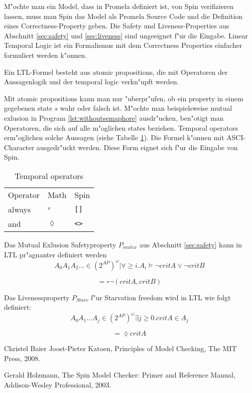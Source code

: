 \documentclass[a4paper, twoside]{article}
\begin{document}
M"ochte man ein Model, dass in Promela definiert ist, von Spin verifizieren lassen, muss man Spin das Model als Promela Source Code und die Definition eines Correctness-Property geben. Die Safety und Liveness-Properties aus Abschnitt \ref{sec:safety} und \ref{sec:liveness} sind ungeeignet f"ur die Eingabe. Linear Temporal Logic ist ein Formalismus mit dem Correctness Properties einfacher formuliert werden k"onnen.

Ein LTL-Formel besteht aus atomic propositions, die mit Operatoren der Aussagenlogik  und der temporal logic verkn"upft werden.

Mit atomic propositions kann man nur "uberpr"ufen, ob ein property in einem gegebenen state $s$ wahr oder falsch ist. M"ochte man beispielsweise mutual exlusion in Program \ref{lst:withoutsemaphore} ausdr"ucken, ben"otigt man Operatoren, die sich auf alle m"oglichen states beziehen. Temporal operators erm"oglichen solche Aussagen (siehe Tabelle \ref{tab:temporal_operators}). Die Formel k"onnen mit ASCI-Character ausgedr"uckt werden. Diese Form eignet sich f"ur die Eingabe von Spin.

\begin{table}
  \centering
  \begin{tabular}{l l l}
    Operator & Math & Spin \\
    always & $\square$ & \verb|[]| \\
    and & $\lozenge$ & \verb|<>| \\
  \end{tabular}
  \caption{Temporal operators }
  \label{tab:temporal_operators}
\end{table}

Das Mutual Exlusion Safetyproperty $P_{mutex}$ aus Abschnitt \ref{sec:safety} kann in LTL pr"agnanter definiert werden
\[
  {A_0 A_1 A_2 \dots \in (2^{AP})^{\omega} | \forall \geq i.   A_i \models \neg critA \lor \neg critB}
\]

\[
= \square \neg (critA,critB)
\]

Das Livenessproperty $P_{Starv}$ f"ur Starvation freedom wird in LTL wie folgt definiert:
\[
 { A_0 A_1 \dots A_j \in (2^{AP})^{\omega} \exists j \geq 0. critA \in A_j}
\]

\[
= \lozenge critA
\]

\appendix

\begin{thebibliography}{9}
Christel Baier Joost-Pieter Katoen,
Principles of Model Checking,
The MIT Press,
2008.

Gerald Holzmann,
The Spin Model Checker: Primer and Reference Manual,
Addison-Wesley Professional,
2003.
\end{thebibliography}
\end{document}
